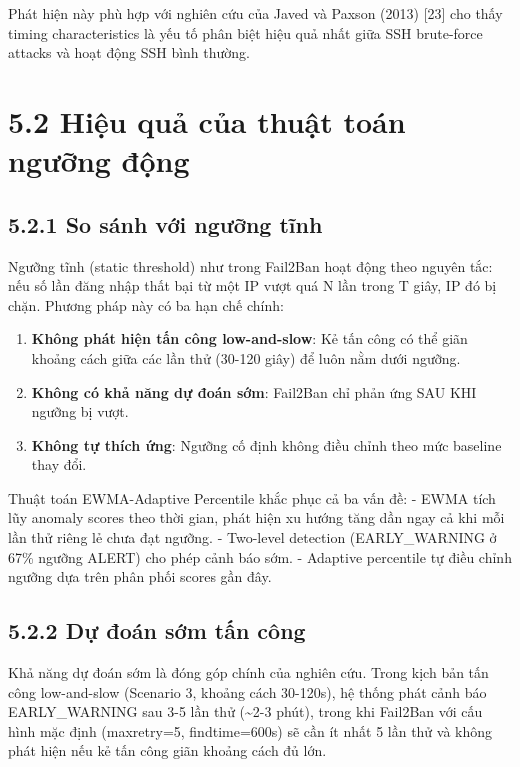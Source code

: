 \documentclass[
  a4paper]{report}
\providecommand{\tightlist}{%
  \setlength{\itemsep}{0pt}\setlength{\parskip}{0pt}}
\begin{document}
Phát hiện này phù hợp với nghiên cứu của Javed và Paxson (2013) {[}23{]}
cho thấy timing characteristics là yếu tố phân biệt hiệu quả nhất giữa
SSH brute-force attacks và hoạt động SSH bình thường.

\section{5.2 Hiệu quả của thuật toán ngưỡng
động}\label{hiux1ec7u-quux1ea3-cux1ee7a-thuux1eadt-touxe1n-ngux1b0ux1ee1ng-ux111ux1ed9ng}

\subsection{5.2.1 So sánh với ngưỡng
tĩnh}\label{so-suxe1nh-vux1edbi-ngux1b0ux1ee1ng-tux129nh}

Ngưỡng tĩnh (static threshold) như trong Fail2Ban hoạt động theo nguyên
tắc: nếu số lần đăng nhập thất bại từ một IP vượt quá N lần trong T
giây, IP đó bị chặn. Phương pháp này có ba hạn chế chính:

\begin{enumerate}
\def\labelenumi{\arabic{enumi}.}
\tightlist
\item
  \textbf{Không phát hiện tấn công low-and-slow}: Kẻ tấn công có thể
  giãn khoảng cách giữa các lần thử (30-120 giây) để luôn nằm dưới
  ngưỡng.
\item
  \textbf{Không có khả năng dự đoán sớm}: Fail2Ban chỉ phản ứng SAU KHI
  ngưỡng bị vượt.
\item
  \textbf{Không tự thích ứng}: Ngưỡng cố định không điều chỉnh theo mức
  baseline thay đổi.
\end{enumerate}

Thuật toán EWMA-Adaptive Percentile khắc phục cả ba vấn đề: - EWMA tích
lũy anomaly scores theo thời gian, phát hiện xu hướng tăng dần ngay cả
khi mỗi lần thử riêng lẻ chưa đạt ngưỡng. - Two-level detection
(EARLY\_WARNING ở 67\% ngưỡng ALERT) cho phép cảnh báo sớm. - Adaptive
percentile tự điều chỉnh ngưỡng dựa trên phân phối scores gần đây.

\subsection{5.2.2 Dự đoán sớm tấn
công}\label{dux1ef1-ux111ouxe1n-sux1edbm-tux1ea5n-cuxf4ng}

Khả năng dự đoán sớm là đóng góp chính của nghiên cứu. Trong kịch bản
tấn công low-and-slow (Scenario 3, khoảng cách 30-120s), hệ thống phát
cảnh báo EARLY\_WARNING sau 3-5 lần thử (\textasciitilde2-3 phút), trong
khi Fail2Ban với cấu hình mặc định (maxretry=5, findtime=600s) sẽ cần ít
nhất 5 lần thử và không phát hiện nếu kẻ tấn công giãn khoảng cách đủ
lớn.
\end{document}
